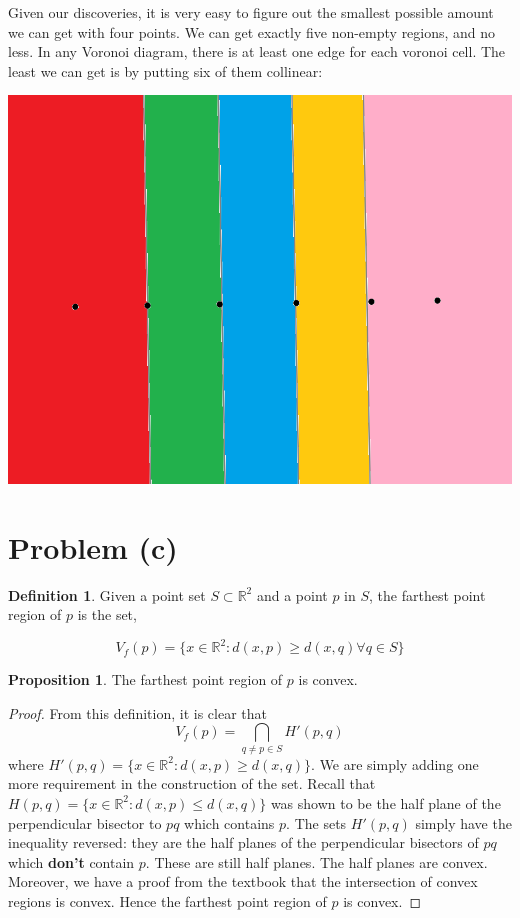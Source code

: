 \documentclass[12pt]{article}
\newcommand{\R}{\mathbb{R}}
\theoremstyle{definition}
\newtheorem*{definition}{Definition}
\newtheorem{proposition}{Proposition}
\begin{document}
Given our discoveries, it is very easy to figure out the smallest possible amount we can get with four points. We can get exactly five non-empty regions, and no less. In any Voronoi diagram, there is at least one edge for each voronoi cell. The least we can get is by putting six of them collinear:

\includegraphics[scale=0.25]{smallest_order_2.png} 



\section{Problem (c)}

\begin{definition}

Given a point set $S\subset \R^2$ and a point $p$ in $S$, the farthest point region of $p$ is the set,

\[V_f(p) = \{x \in \R^2 : d(x,p ) \ge d(x,q) \forall q\in S\}\]
\end{definition}

\begin{proposition}
The farthest point region of $p$ is convex.
\end{proposition}
\begin{proof}
From this definition, it is clear that 
\[ V_f(p) = \bigcap_{q\ne p \in S} H'(p,q) \] where $H'(p,q) = \{x\in \R^2 : d(x,p) \ge d(x,q)\}$. We are simply adding one more requirement in the construction of the set. Recall that $H(p,q) = \{x\in \R^2 : d(x,p) \le d(x,q)\}$ was shown to be the half plane of the perpendicular bisector to $pq$ which contains $p$. The sets $ H'(p,q) $ simply have the inequality reversed: they are the half planes of the perpendicular bisectors of $pq$ which \textbf{don't} contain $p$. These are still half planes. The half planes are convex. Moreover, we have a proof from the textbook that the intersection of convex regions is convex. Hence the farthest point region of $p$ is convex.
\end{proof}
\end{document}
